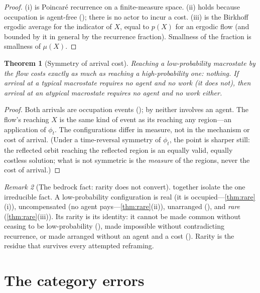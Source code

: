 \documentclass[11pt,a4paper]{article}
\theoremstyle{thmstyle}
\newtheorem{theorem}{Theorem}[section]
\theoremstyle{definition}
\theoremstyle{remark}
\newtheorem{remark}[theorem]{Remark}
\begin{document}
\begin{proof}
(i) is Poincar\'e recurrence on a finite-measure space. (ii) holds because
occupation is agent-free (); there is no actor to incur a
cost. (iii) is the Birkhoff ergodic average for the indicator of $X$, equal to
$p(X)$ for an ergodic flow (and bounded by it in general by the recurrence
fraction). Smallness of the fraction is smallness of $\mu(X)$.
\end{proof}

\begin{theorem}[Symmetry of arrival cost]
\label{thm:arrival-symmetry}
Reaching a low-probability macrostate by the flow costs exactly as much as
reaching a high-probability one: nothing. If arrival at a typical macrostate
requires no agent and no work (it does not), then arrival at an atypical
macrostate requires no agent and no work either.
\end{theorem}

\begin{proof}
Both arrivals are occupation events (); by 
neither involves an agent. The flow's reaching $X$ is the same kind of event as
its reaching any region---an application of $\phi_t$. The configurations differ
in measure, not in the mechanism or cost of arrival. (Under a time-reversal
symmetry of $\phi_t$, the point is sharper still: the reflected orbit reaching
the reflected region is an equally valid, equally costless solution; what is not
symmetric is the \emph{measure} of the regions, never the cost of arrival.)
\end{proof}

\begin{remark}[The bedrock fact: rarity does not convert]
\label{rem:bedrock}
 together isolate the one irreducible fact.
A low-probability configuration is real (it is occupied---\ref{thm:rare}(i)),
uncompensated (no agent pays---\ref{thm:rare}(ii)), unarranged
(), and \emph{rare} (\ref{thm:rare}(iii)). Its rarity is
its identity: it cannot be made common without ceasing to be low-probability
(), made impossible without contradicting recurrence,
or made arranged without an agent and a cost (). Rarity is
the residue that survives every attempted reframing.
\end{remark}

\section{The category errors}
\label{sec:errors}
\end{document}
